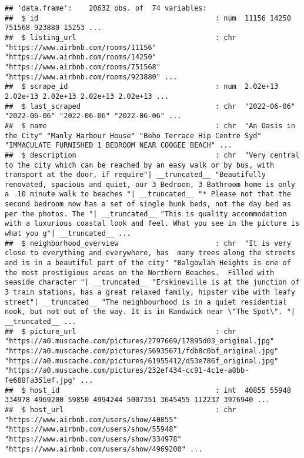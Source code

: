 \documentclass[
]{article}
\begin{document}
\begin{verbatim}
## 'data.frame':    20632 obs. of  74 variables:
##  $ id                                          : num  11156 14250 751568 923880 15253 ...
##  $ listing_url                                 : chr  "https://www.airbnb.com/rooms/11156" "https://www.airbnb.com/rooms/14250" "https://www.airbnb.com/rooms/751568" "https://www.airbnb.com/rooms/923880" ...
##  $ scrape_id                                   : num  2.02e+13 2.02e+13 2.02e+13 2.02e+13 2.02e+13 ...
##  $ last_scraped                                : chr  "2022-06-06" "2022-06-06" "2022-06-06" "2022-06-06" ...
##  $ name                                        : chr  "An Oasis in the City" "Manly Harbour House" "Boho Terrace Hip Centre Syd" "IMMACULATE FURNISHED 1 BEDROOM NEAR COOGEE BEACH" ...
##  $ description                                 : chr  "Very central to the city which can be reached by an easy walk or by bus, with transport at the door, if require"| __truncated__ "Beautifully renovated, spacious and quiet, our 3 Bedroom, 3 Bathroom home is only a  10 minute walk to beaches "| __truncated__ "* Please not that the second bedroom now has a set of single bunk beds, not the day bed as per the photos. The "| __truncated__ "This is quality accommodation with a luxurious coastal look and feel. What you see in the picture is what you g"| __truncated__ ...
##  $ neighborhood_overview                       : chr  "It is very close to everything and everywhere, has  many trees along the streets and is in a beautiful part of the city" "Balgowlah Heights is one of the most prestigious areas on the Northern Beaches.  Filled with seaside character "| __truncated__ "Erskineville is at the junction of 3 train stations, has a great relaxed family, hipster vibe with leafy street"| __truncated__ "The neighbourhood is in a quiet residential nook, but not out of the way. It is in Randwick near \"The Spot\". "| __truncated__ ...
##  $ picture_url                                 : chr  "https://a0.muscache.com/pictures/2797669/17895d03_original.jpg" "https://a0.muscache.com/pictures/56935671/fdb8c0bf_original.jpg" "https://a0.muscache.com/pictures/61955412/d53e786f_original.jpg" "https://a0.muscache.com/pictures/232ef434-cc91-4c1e-a8bb-fe688fa351ef.jpg" ...
##  $ host_id                                     : int  40855 55948 334978 4969200 59850 4994244 5007351 3645455 112237 3976940 ...
##  $ host_url                                    : chr  "https://www.airbnb.com/users/show/40855" "https://www.airbnb.com/users/show/55948" "https://www.airbnb.com/users/show/334978" "https://www.airbnb.com/users/show/4969200" ...

\end{verbatim}
\end{document}
